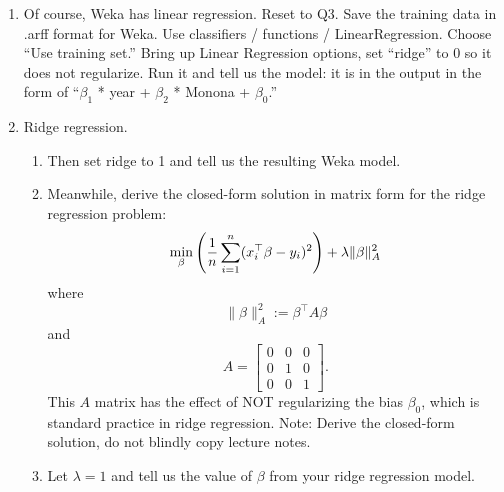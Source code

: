 \documentclass[a4paper]{article}
\theoremstyle{definition}
\begin{document}
\begin{enumerate}
\item
Of course, Weka has linear regression.  Reset to Q3.  Save the training data in .arff format for Weka.  Use classifiers / functions / LinearRegression.  Choose ``Use training set.''  
  Bring up Linear Regression options, set ``ridge'' to 0 so it does not regularize.  Run it and tell us the model: it is in the output in the form of ``$\beta_1$ * year + $\beta_2$ * Monona + $\beta_0$.'' 

\item Ridge regression.
\begin{enumerate}
\item
Then set ridge to 1 and tell us the resulting Weka model.
\item
Meanwhile, derive the closed-form solution in matrix form for the ridge regression problem:
$$\min_\beta \left({1\over n} \sum_{i=1}^n (x_i^\top \beta - y_i)^2 \right) + \lambda \|\beta\|_A^2$$
where 
$$\|\beta\|_A^2 := \beta^\top A \beta$$
and
$$A=
\begin{bmatrix}
0 & 0 & 0 \\
0 & 1 & 0 \\
0 & 0 & 1
\end{bmatrix}.$$
This $A$ matrix has the effect of NOT regularizing the bias $\beta_0$, which is standard practice in ridge regression.
Note: Derive the closed-form solution, do not blindly copy lecture notes.
\item
Let $\lambda=1$ and tell us the value of $\beta$ from your ridge regression model.
\end{enumerate}

\end{enumerate}
\end{document}
